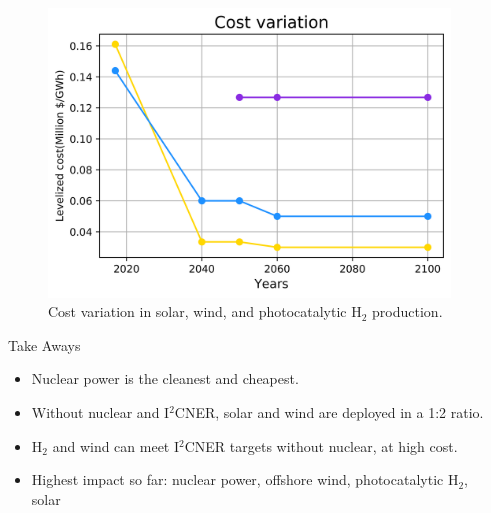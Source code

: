 \documentclass[final]{beamer}
\newlength{\onecolwid}
\newlength{\twocolwid}
\newlength{\threecolwid}
\begin{document}
\begin{frame}[t]
\begin{columns}[t,totalwidth=\threecolwid]
\begin{column}{\twocolwid}
\end{column} %

\begin{column}{\onecolwid} %

\begin{figure}[H] 
\centering
\includegraphics[scale=1.6]{cost}
\caption{Cost variation in solar, wind, and photocatalytic H$_2$ production.}
\label{cost}
\end{figure}
         \begin{alertblock}{Take Aways}
	\begin{itemize}
                \item Nuclear power is the cleanest and cheapest.
                                        
                \item Without nuclear and I$^2$CNER, solar and wind are deployed in a 1:2 ratio.
                
                \item H$_2$ and wind can meet I$^2$CNER targets without nuclear, at high cost.
                
                \item Highest impact so far: nuclear power, offshore wind, photocatalytic H$_2$, solar
	\end{itemize}
        \end{alertblock}
   



\end{column}
\end{columns}
\end{frame}
\end{document}
